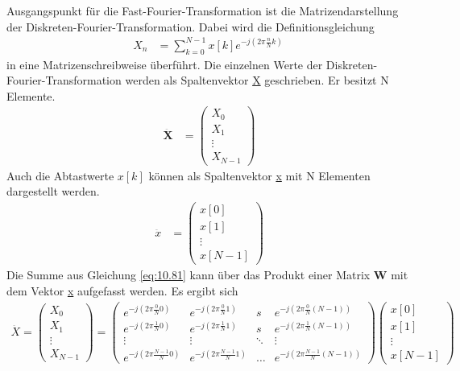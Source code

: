 Ausgangspunkt für die Fast-Fourier-Transformation ist die Matrizendarstellung der Diskreten-Fourier-Transformation. Dabei wird die Definitionsgleichung
\begin{align}
X_{n} &= \sum\limits_{k = 0}^{N - 1}{x[ k]  e^{- j  \left( 2  \pi  \frac{n}{N}  k \right)}}\ \label{eq:10.81}
\end{align}
in eine Matrizenschreibweise überführt. Die einzelnen Werte der Diskreten-Fourier-Transformation werden als Spaltenvektor \ul{X} geschrieben. Er besitzt N Elemente.
\begin{align}
\overset{\underbar{}}{\mathbf{X}} &= \begin{pmatrix}
X_{0} \\
X_{1} \\
 \vdots \\
X_{N - 1}
\end{pmatrix} \label{eq:10.82}
\end{align}
Auch die Abtastwerte \(x[k]\) können als Spaltenvektor \ul{x} mit N Elementen dargestellt werden.
\begin{align}
\overset{\underbar{}}{x} &= \begin{pmatrix}
x[ 0] \\
x[ 1] \\
 \vdots \\
x[ N - 1]
\end{pmatrix} \label{eq:10.83}
\end{align}
Die Summe aus Gleichung \eqref{eq:10.81} kann über das Produkt einer Matrix \textbf{W} mit dem Vektor \ul{x} aufgefasst werden. Es ergibt sich
\begin{align}
\overset{\underbar{}}{X} = \begin{pmatrix}
X_{0} \\
X_{1} \\
 \vdots \\
X_{N - 1}
\end{pmatrix} = \begin{pmatrix}
e^{- j  \left( 2  \pi  \frac{0}{N}  0 \right)} & e^{- j  \left( 2  \pi  \frac{0}{N}  1 \right)} & s & e^{- j  \left( 2  \pi  \frac{0}{N}  (N - 1) \right)} \\
e^{- j  \left( 2  \pi  \frac{1}{N}  0 \right)} & e^{- j  \left( 2  \pi  \frac{1}{N}  1 \right)} & s & e^{- j  \left( 2  \pi  \frac{1}{N}  (N - 1) \right)} \\
 \vdots & \vdots & \ddots & \vdots \\
e^{- j  \left( 2  \pi  \frac{N - 1}{N}  0 \right)} & e^{- j  \left( 2  \pi  \frac{N - 1}{N}  1 \right)} & \ldots & e^{- j  \left( 2  \pi  \frac{N - 1}{N}  (N - 1) \right)}
\end{pmatrix}  \begin{pmatrix}
x[ 0] \\
x[ 1] \\
 \vdots \\
x[ N - 1]
\end{pmatrix} \label{eq:10.84}
\end{align}
